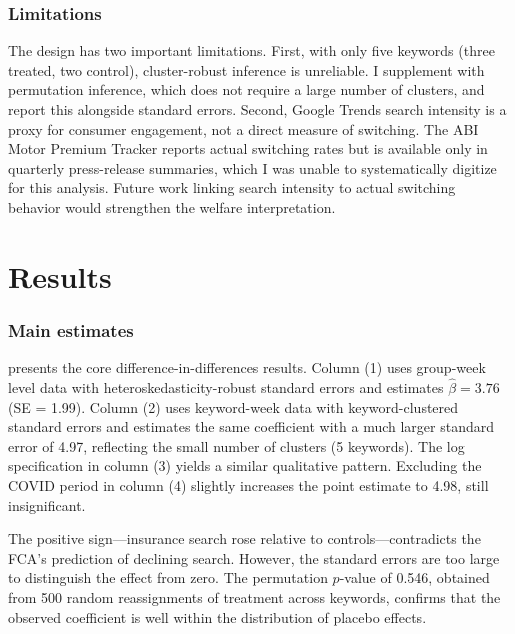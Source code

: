 \documentclass[12pt]{article}
\begin{document}
\subsubsection*{Limitations} The design has two important limitations. First, with only five keywords (three treated, two control), cluster-robust inference is unreliable. I supplement with permutation inference, which does not require a large number of clusters, and report this alongside standard errors. Second, Google Trends search intensity is a proxy for consumer engagement, not a direct measure of switching. The ABI Motor Premium Tracker reports actual switching rates but is available only in quarterly press-release summaries, which I was unable to systematically digitize for this analysis. Future work linking search intensity to actual switching behavior would strengthen the welfare interpretation.

\section{Results}
\label{sec:results}

\subsubsection*{Main estimates}  presents the core difference-in-differences results. Column (1) uses group-week level data with heteroskedasticity-robust standard errors and estimates $\hat{\beta} = 3.76$ (SE = 1.99). Column (2) uses keyword-week data with keyword-clustered standard errors and estimates the same coefficient with a much larger standard error of 4.97, reflecting the small number of clusters (5 keywords). The log specification in column (3) yields a similar qualitative pattern. Excluding the COVID period in column (4) slightly increases the point estimate to 4.98, still insignificant.

The positive sign---insurance search rose relative to controls---contradicts the FCA's prediction of declining search. However, the standard errors are too large to distinguish the effect from zero. The permutation $p$-value of 0.546, obtained from 500 random reassignments of treatment across keywords, confirms that the observed coefficient is well within the distribution of placebo effects.


\end{document}
